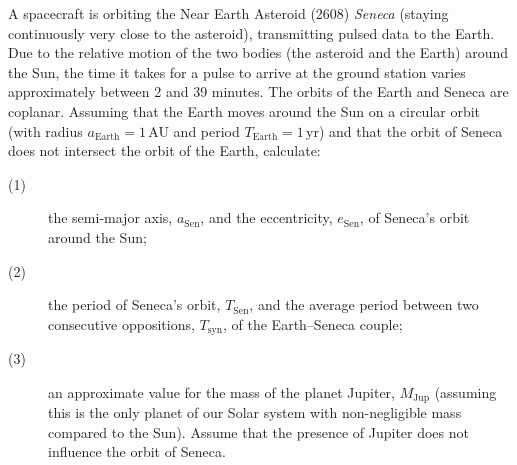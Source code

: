 A spacecraft is orbiting the Near Earth Asteroid (2608) \textit{Seneca}
(staying continuously very close to the asteroid), transmitting pulsed data to
the Earth. Due to the relative motion of the two bodies (the asteroid and the
Earth) around the Sun, the time it takes for a pulse to arrive at the ground
station varies approximately between 2 and 39 minutes. The orbits of the Earth
and Seneca are coplanar. Assuming that the Earth moves around the Sun on a
circular orbit (with radius $a_{\mathrm{Earth}} = 1$\,AU and period
$T_{\mathrm{Earth}} = 1$\,yr) and that the orbit of Seneca does not intersect
the orbit of the Earth, calculate:

\begin{description}
\item[(1)] the semi-major axis, $a_{\mathrm{Sen}}$, and the eccentricity,
  $e_{\mathrm{Sen}}$, of Seneca's orbit around the Sun;
\item[(2)] the period of Seneca's orbit, $T_{\mathrm{Sen}}$, and the average
  period between two consecutive oppositions, $T_{\mathrm{syn}}$, of the
  Earth--Seneca couple;
\item[(3)] an approximate value for the mass of the planet Jupiter,
  $M_{\mathrm{Jup}}$ (assuming this is the only planet of our Solar system with
  non-negligible mass compared to the Sun). Assume that the presence of
  Jupiter does not influence the orbit of Seneca.
\end{description}
